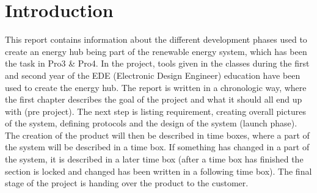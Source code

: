 
\chapter{Introduction}
This report contains information about the different development phases used to create an energy hub being part of the renewable energy system, which has been the task in Pro3 \& Pro4. In the project, tools given in the classes during the first and second year of the EDE (Electronic Design Engineer) education have been used to create the energy hub. The report is written in a chronologic way, where the first chapter describes the goal of the project and what it should all end up with (pre project). The next step is listing requirement, creating overall pictures of the system, defining protocols and the design of the system (launch phase). The creation of the product will then be described in time boxes, where a part of the system will be described in a time box. If something has changed in a part of the system, it is described in a later time box (after a time box has finished the section is locked and changed has been written in a following time box).
The final stage of the project is handing over the product to the customer.
	

\newpage
